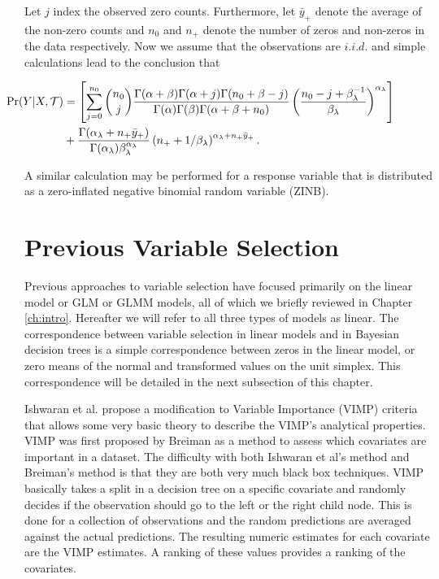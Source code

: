 Let $j$ index the observed zero counts. Furthermore, let $\bar{y}_{+}$ denote the average of the non-zero counts and $n_0$ and $n_+$ denote the number of zeros and non-zeros in the data respectively. 
 Now we assume that the observations are $i.i.d.$ and simple calculations lead to the conclusion that
 
 \begin{align}\label{eqn:zip_int_lhood}\hspace{-.7in}
 \Pr(Y\vert X, \mathcal{T})& = \left[\sum_{j=0}^{n_0} {n_0 \choose j}\frac{\Gamma(\alpha+\beta)\Gamma(\alpha+j)\Gamma(n_0+\beta-j)}{\Gamma(\alpha)\Gamma(\beta)\Gamma(\alpha+\beta+n_0)}\left(\frac{n_0-j+\beta_{\lambda}^{-1}}{\beta_{\lambda}}\right)^{\alpha_{\lambda}} \right] \\ \nonumber
 & + \frac{\Gamma(\alpha_{\lambda}+n_+\bar{y}_+)}{\Gamma(\alpha_{\lambda})\beta_{\lambda}^{\alpha_{\lambda}}}\left(n_+ + 1/\beta_{\lambda} \right)^{\alpha_{\lambda}+n_+\bar{y}_+}.
\end{align}

A similar calculation may be performed for a response variable that is distributed as a zero-inflated negative binomial random variable (ZINB).
 
\section{Previous Variable Selection}
\label{ch:p4sub_var_sel}

Previous approaches to variable selection have focused primarily on the linear model or GLM or GLMM models, all of which we briefly reviewed in Chapter \ref{ch:intro}. Hereafter we will refer to all three types of models as linear. The correspondence between variable selection in linear models and in Bayesian decision trees is a simple correspondence between zeros in the linear model, or zero means of the normal and transformed values on the unit simplex. This correspondence will be detailed in the next subsection of this chapter.   

Ishwaran et al. \cite{ishwaran2010high} propose a modification to Variable Importance (VIMP) criteria that allows some very basic theory to describe the VIMP's analytical properties. VIMP was first proposed by Breiman \cite{breiman2001random} as a method to assess which covariates are important in a dataset. The difficulty with both Ishwaran et al's method and Breiman's method is that they are both very much black box techniques. VIMP basically takes a split in a decision tree on a specific covariate and randomly decides if the observation should go to the left or the right child node. This is done for a collection of observations and the random predictions are averaged against the actual predictions. The resulting numeric estimates for each covariate are the VIMP estimates. A ranking of these values provides a ranking of the covariates. 

